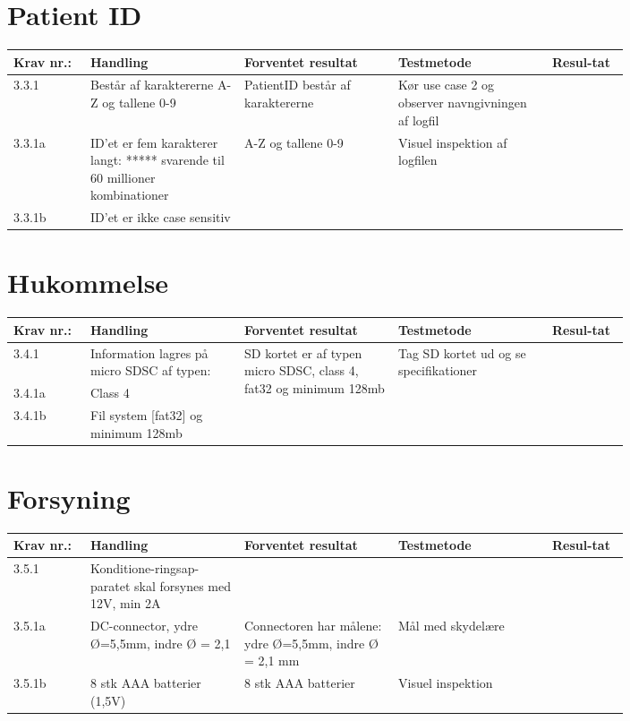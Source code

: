 			\section{Patient ID}
				\begin{longtable}{|p{0.1\linewidth}|p{0.2\linewidth}|p{0.2\linewidth}|p{0.2\linewidth}|p{0.1\linewidth}|}
					\hline
					\rowcolor{usDef}
					Krav nr.: & Handling & Forventet resultat & Testmetode & Resul-tat  \\\hline
					3.3.1 & Består af karaktererne A-Z og tallene 0-9 & PatientID består af karaktererne  & Kør use case 2  og observer navngivningen af logfil & \\ \hline
					3.3.1a& ID’et er fem karakterer langt: ***** svarende til 60 millioner kombinationer & \multirow{2}{0.2\linewidth}{A-Z og tallene 0-9} & \multirow{2}{0.2\linewidth}{Visuel inspektion af logfilen}  & \multirow{2}{0.2\linewidth}{} \\ \cline{1-2}
					3.3.1b& ID’et er ikke case sensitiv  & &  & \\ \hline
				\end{longtable}
			
			\section{Hukommelse}
				\begin{longtable}{|p{0.1\linewidth}|p{0.2\linewidth}|p{0.2\linewidth}|p{0.2\linewidth}|p{0.1\linewidth}|}
					\hline
					\rowcolor{usDef}
					Krav nr.: & Handling & Forventet resultat & Testmetode & Resul-tat  \\\hline
					3.4.1& Information lagres på micro SDSC af typen: & \multirow{3}{\linewidth}{SD kortet er af typen micro SDSC, class 4, fat32 og minimum 128mb} & \multirow{3}{\linewidth}{Tag SD kortet ud og se specifikationer}  & \multirow{3}{\linewidth}{}  \\ \cline{1-2}
					3.4.1a& Class 4 & &  & \\ \cline{1-2}
					3.4.1b& Fil system [fat32] og minimum 128mb  & &  & \\ \hline
				\end{longtable}
			
			\pagebreak
			\section{Forsyning}
				\begin{longtable}{|p{0.1\linewidth}|p{0.2\linewidth}|p{0.2\linewidth}|p{0.2\linewidth}|p{0.1\linewidth}|}
					\hline
					\rowcolor{usDef}
					Krav nr.: & Handling & Forventet resultat & Testmetode & Resul-tat  \\\hline
					3.5.1& Konditione-ringsap-paratet skal forsynes med 12V, min 2A & &  & \\ \hline
					3.5.1a& DC-connector, ydre Ø=5,5mm, indre Ø = 2,1  & Connectoren har målene: ydre Ø=5,5mm, indre Ø = 2,1 mm & Mål med skydelære  & \\ \hline
					3.5.1b& 8 stk AAA batterier (1,5V)  & 8 stk AAA batterier & Visuel inspektion  & \\ \hline
				\end{longtable}
			
